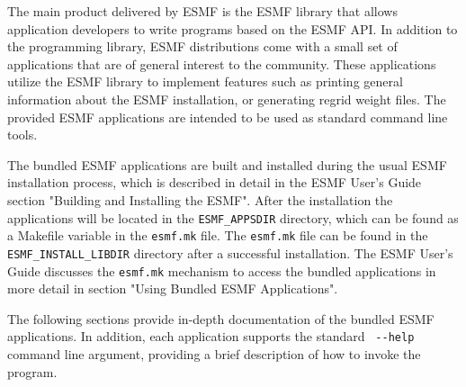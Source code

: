 

The main product delivered by ESMF is the ESMF library that allows application
developers to write programs based on the ESMF API. In addition to the 
programming library, ESMF distributions come with a small set of applications
that are of general interest to the community. These applications utilize
the ESMF library to implement features such as printing general information
about the ESMF installation, or generating regrid weight files. The provided
ESMF applications are intended to be used as standard command line tools.



The bundled ESMF applications are built and installed during the usual ESMF installation process, which is described in detail in the ESMF User's Guide section "Building and Installing the ESMF". After the installation the applications will be located in the {\tt ESMF\_APPSDIR} directory, which can be found as a Makefile variable in the {\tt esmf.mk} file. The {\tt esmf.mk} file can be found in the {\tt ESMF\_INSTALL\_LIBDIR} directory after a successful installation.  The ESMF User's Guide discusses the {\tt esmf.mk} mechanism to access the bundled applications in more detail in section "Using Bundled ESMF Applications".

The following sections provide in-depth documentation of the bundled ESMF applications. In addition, each application supports the standard \verb+ --help + command line argument, providing a brief description of how to invoke the program.

